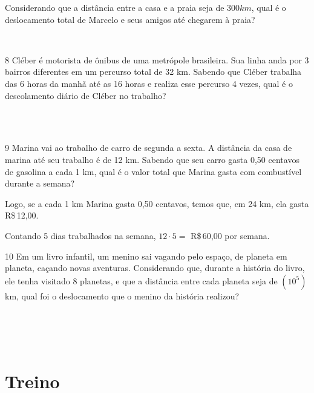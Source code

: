 {{Considerando que a distância entre a casa e a praia seja de $300 km$, qual
é o deslocamento total de Marcelo e seus amigos até chegarem à praia?

\\

\pagebreak

\num{8} Cléber é motorista de ônibus de uma metrópole brasileira. Sua linha
anda por 3 bairros diferentes em um percurso total de 32 km. Sabendo que
Cléber trabalha das 6 horas da manhã até as 16 horas e realiza esse
percurso 4 vezes, qual é o descolamento diário de Cléber no trabalho?

\\
\\

\num{9} Marina vai ao trabalho de carro de segunda a sexta. A distância da
casa de marina até seu trabalho é de 12 km. Sabendo que seu carro gasta
0,50 centavos de gasolina a cada 1 km, qual é o valor total que Marina
gasta com combustível durante a semana?


Logo, se a cada 1 km Marina gasta 0,50 centavos, temos que, em 24 km,
ela gasta R\$\,12,00.

Contando 5 dias trabalhados na semana, $12 \cdot 5 =$ R\$\,60,00 por semana.

\num{10} Em um livro infantil, um menino sai vagando pelo espaço, de planeta
em planeta, caçando novas aventuras. Considerando que, durante a
história do livro, ele tenha visitado 8 planetas, e que a distância
entre cada planeta seja de $(10^5)$ km, qual foi o deslocamento que o
menino da história realizou?

\\
\\
\\

\pagebreak

\section*{Treino}

}}

